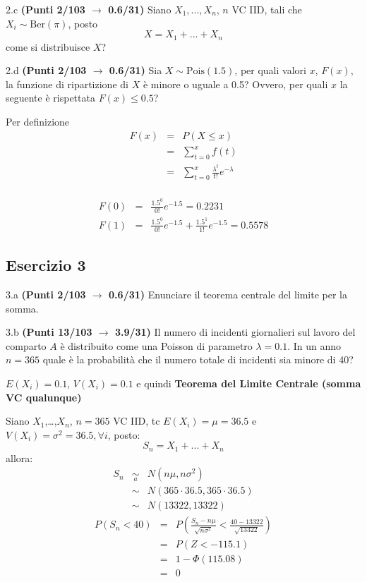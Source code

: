 \documentclass[
  11pt,
]{book}
\theoremstyle{mytheoremstyle}
\theoremstyle{mydefstyle}
\newenvironment{sol}
  {
  \begin{tcolorbox}[enhanced,breakable,arc=0.1mm,boxrule=1pt,colback=white,colframe=iblue,
  title=\bf \fontfamily{lmss}\selectfont \hspace{.5 cm} Soluzione,drop fuzzy shadow]

}{
\end{tcolorbox}
  }
\begin{document}
2.c \textbf{(Punti 2/103 \(\rightarrow\) 0.6/31)} Siano \(X_1,...,X_n\), \(n\) VC IID, tali che \(X_i\sim \text{Ber}(\pi)\), posto
\[
 X = X_1+...+X_n
\]
come si distribuisce \(X\)?

2.d \textbf{(Punti 2/103 \(\rightarrow\) 0.6/31)} Sia \(X\sim \text{Pois}(1.5)\), per quali valori \(x\), \(F(x)\), la funzione di ripartizione di \(X\) è minore o uguale a 0.5? Ovvero, per quali \(x\) la seguente è rispettata \(F(x)\le 0.5\)?

\begin{sol}
Per definizione
\begin{eqnarray*}
F(x)   &=&  P(X\le x)\\
       &=&\sum_{t=0}^x f(t)\\
       &=&\sum_{t=0}^x \frac{\lambda^t}{t!}e^{-\lambda}\\
\end{eqnarray*}

\begin{eqnarray*}
  F(0) &=&  \frac{1.5^0}{0!}e^{-1.5}=0.2231\\
  F(1) &=&  \frac{1.5^0}{0!}e^{-1.5}+  \frac{1.5^1}{1!}e^{-1.5}=0.5578
\end{eqnarray*}

\end{sol}

\subsection{Esercizio 3}\label{esercizio-3-8}

3.a \textbf{(Punti 2/103 \(\rightarrow\) 0.6/31)} Enunciare il teorema centrale del limite per la somma.

3.b \textbf{(Punti 13/103 \(\rightarrow\) 3.9/31)} Il numero di incidenti giornalieri sul lavoro del comparto \(A\) è distribuito come una
Poisson di parametro \(\lambda = 0.1\). In un anno \(n=365\) quale è la probabilità che il numero totale di
incidenti sia minore di 40?

\begin{sol}
\(E(X_i)=0.1\), \(V(X_i)=0.1\) e quindi
\textbf{Teorema del Limite Centrale (somma VC qualunque)}

Siano \(X_1\),\ldots,\(X_n\), \(n=365\) VC IID, tc \(E(X_i)=\mu=36.5\) e \(V(X_i)=\sigma^2=36.5,\forall i\), posto:
\[
      S_n = X_1 + ... + X_n
      \]
allora:\begin{eqnarray*}
  S_n & \mathop{\sim}\limits_{a}& N(n\mu,n\sigma^2) \\
     &\sim & N(365\cdot36.5,365\cdot36.5) \\
     &\sim & N(13322,13322) 
  \end{eqnarray*}\begin{eqnarray*}
      P( S_n   <   40 ) 
        &=& P\left(  \frac { S_n  -  n\mu }{ \sqrt{n\sigma^2} }  <  \frac { 40  -  13322 }{\sqrt{ 13322 }} \right)  \\
                 &=& P\left(  Z   <   -115.1 \right) \\    
                 &=&  1-\Phi( 115.08 ) \\ &=&  0 
      \end{eqnarray*}

\end{sol}
\end{document}
